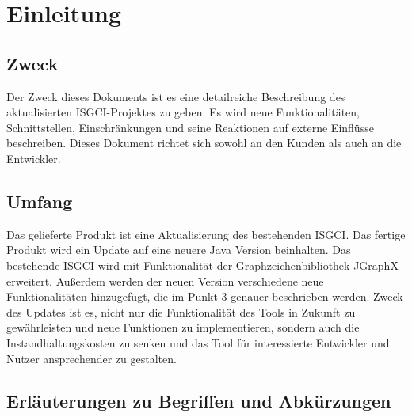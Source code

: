 \documentclass[10pt,a4paper]{article}
\begin{document}
\section{Einleitung}%



 	\subsection{Zweck} %
	
	Der Zweck dieses Dokuments ist es eine detailreiche Beschreibung des aktualisierten ISGCI-Projektes zu geben. Es wird neue Funktionalitäten, Schnittstellen, Einschränkungen und seine Reaktionen auf externe Einflüsse beschreiben. Dieses Dokument richtet sich sowohl an den Kunden als auch an die Entwickler.
	

  	\subsection{Umfang} %
   Das gelieferte Produkt ist eine Aktualisierung des bestehenden ISGCI. Das fertige Produkt wird ein Update auf eine neuere Java Version beinhalten. Das bestehende ISGCI wird mit Funktionalität der Graphzeichenbibliothek JGraphX erweitert. Außerdem werden der neuen Version verschiedene neue Funktionalitäten hinzugefügt, die im Punkt 3 genauer beschrieben werden. Zweck des Updates ist es, nicht nur die Funktionalität des Tools in Zukunft zu gewährleisten und neue Funktionen zu implementieren, sondern auch die Instandhaltungskosten zu senken und das Tool für interessierte Entwickler und Nutzer ansprechender zu gestalten.

  	\subsection{Erläuterungen zu Begriffen und Abkürzungen} %
\end{document}

